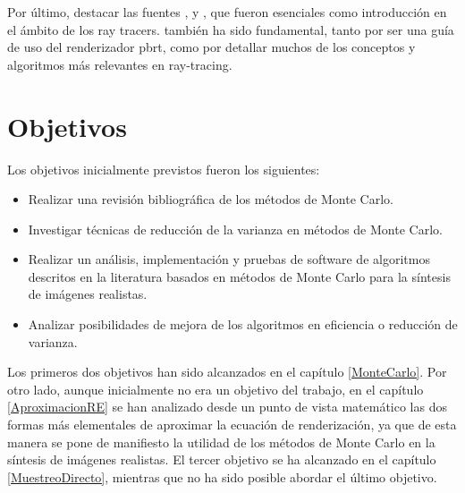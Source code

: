 Por último, destacar las fuentes \cite{Shirley2020RTW1}, \cite{Shirley2020RTW2} y \cite{Shirley2020RTW3}, que fueron esenciales como introducción en el ámbito de los ray tracers. \cite{Pharr2016} también ha sido fundamental, tanto por ser una guía de uso del renderizador pbrt, como por detallar muchos de los conceptos y algoritmos más relevantes en ray-tracing. 

\chapter{Objetivos}

Los objetivos inicialmente previstos fueron los siguientes:

\begin{itemize}
\item Realizar una revisión bibliográfica de los métodos de Monte Carlo.
\item Investigar técnicas de reducción de la varianza en métodos de Monte Carlo.
\item Realizar un análisis, implementación y pruebas de software de algoritmos descritos en la literatura basados en métodos de Monte Carlo para la síntesis de imágenes realistas.
\item Analizar posibilidades de mejora de los algoritmos en eficiencia o reducción de varianza.
\end{itemize}

Los primeros dos objetivos han sido alcanzados en el capítulo \ref{MonteCarlo}. Por otro lado, aunque inicialmente no era un objetivo del trabajo, en el capítulo \ref{AproximacionRE} se han analizado desde un punto de vista matemático las dos formas más elementales de aproximar la ecuación de renderización, ya que de esta manera se pone de manifiesto la utilidad de los métodos de Monte Carlo en la síntesis de imágenes realistas. El tercer objetivo se ha alcanzado en el capítulo \ref{MuestreoDirecto}, mientras que no ha sido posible abordar el último objetivo.

